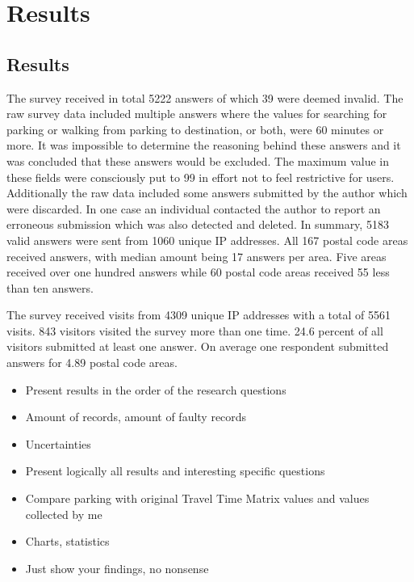 \section{Results}
\justify

\subsection{Results}
\justify
The survey received in total 5222 answers of which 39 were deemed invalid. The raw survey data included multiple answers where the values for searching for parking or walking from parking to destination, or both, were 60 minutes or more. It was impossible to determine the reasoning behind these answers and it was concluded that these answers would be excluded. The maximum value in these fields were consciously put to 99 in effort not to feel restrictive for users. Additionally the raw data included some answers submitted by the author which were discarded. In one case an individual contacted the author to report an erroneous submission which was also detected and deleted. In summary, 5183 valid answers were sent from 1060 unique IP addresses. All 167 postal code areas received answers, with median amount being 17 answers per area. Five areas received over one hundred answers while 60 postal code areas received 55 less than ten answers. 

The survey received visits from 4309 unique IP addresses with a total of 5561 visits. 843 visitors visited the survey more than one time. 24.6 percent of all visitors submitted at least one answer. On average one respondent submitted answers for 4.89 postal code areas.

\begin{itemize}
  \item Present results in the order of the research questions
  \item Amount of records, amount of faulty records
  \item Uncertainties
  \item Present logically all results and interesting specific questions
  \item Compare parking with original Travel Time Matrix values and values collected by me
  \item Charts, statistics
  \item Just show your findings, no nonsense
\end{itemize}